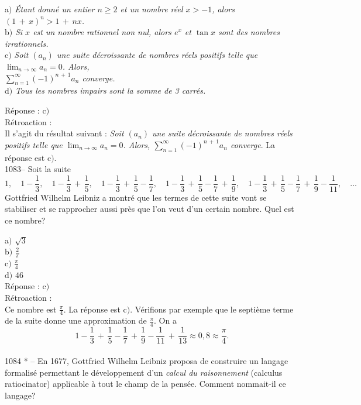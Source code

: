 ﻿\documentclass[letterpaper, 12pt]{article}
\begin{document}
a$)$ {\sl \'Etant donn\'e un entier $n\ge2$ et un nombre r\'eel $x>-1$,
alors $(1\,+\,x)^n>1\,+\,nx$.} \\[2mm]
b$)$ {\sl Si $x$ est un nombre rationnel non nul, alors $e^x$ et $\tan x$
sont des nombres irrationnels.} \\[2mm]
c$)$ {\sl Soit $(a_n)$ une suite d\'ecroissante de nombres r\'eels positifs
telle que $\lim_{n\to\infty}a_n=0$.  Alors, \\[2mm]
$\sum_{n=1}^{\infty}(-1)^{n\,+\,1}a_n$ converge.} \\[2mm]
d$)$ {\sl Tous les nombres impairs sont la somme de 3 carr\'es.}

R\'eponse : c$)$\\

R\'etroaction : \\
Il s'agit du r\'esultat suivant : {\sl Soit $(a_n)$ une suite
d\'ecroissante de nombres r\'eels positifs telle que
$\lim_{n\to\infty}a_n=0$. Alors,
$\sum_{n=1}^{\infty}(-1)^{n\,+\,1}a_n$ converge}.
La r\'eponse est c$)$.\\

1083-- Soit la suite
$$\displaystyle{1,\quad1-\frac13,\quad1-\frac13\,+\,\frac15,\quad1-\frac13\,+\,\frac15-\frac17,\quad1-\frac13\,+\,\frac15-\frac17\,+\,\frac19,\quad
1-\frac13\,+\,\frac15-\frac17\,+\,\frac19-\frac1{11},\quad\ldots}$$
Gottfried Wilhelm Leibniz a montr\'e que les termes de cette suite
vont se stabiliser et se rapprocher aussi pr\`es que l'on veut d'un
certain nombre. Quel est ce nombre?

a$)$ $\sqrt3$ \\ [2mm] b$)$ $\frac2{\pi}$ \\ [2mm] c$)$
$\frac{\pi}4$ \\ [2mm]
d$)$ $46$\\

R\'eponse : c$)$\\

R\'etroaction : \\
Ce nombre est $\frac{\pi}4$. La r\'eponse est c$)$. V\'erifions par
exemple que le septi\`eme terme de la suite donne une approximation
de $\frac{\pi}4$. On a
$$1-\frac13\,+\,\frac15-\frac17\,+\,\frac19-\frac1{11}\,+\,\frac1{13}\approx0,8\approx\frac{\pi}4.$$
\\

1084 * -- En 1677, Gottfried Wilhelm Leibniz proposa de construire
un langage formalis\'e permettant le d\'eveloppement d'un {\sl
calcul du raisonnement} (\og calculus ratiocinator\fg) applicable
\`a tout le champ de la pens\'ee. Comment nommait-il ce langage?
\end{document}
